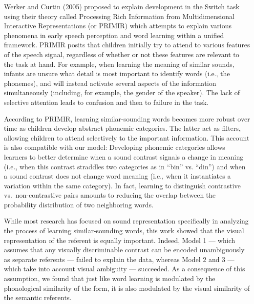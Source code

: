 \documentclass[english,,man]{apa6}
\theoremstyle{definition}
\theoremstyle{definition}
\theoremstyle{definition}
\theoremstyle{remark}
\begin{document}
Werker and Curtin (2005) proposed to explain development in the Switch
task using their theory called Processing Rich Information from
Multidimensional Interactive Representations (or PRIMIR) which attempts
to explain various phenomena in early speech perception and word
learning within a unified framework. PRIMIR posits that children
initially try to attend to various features of the speech signal,
regardless of whether or not these features are relevant to the task at
hand. For example, when learning the meaning of similar sounds, infants
are unsure what detail is most important to identify words (i.e., the
phonemes), and will instead activate several aspects of the information
simultaneously (including, for example, the gender of the speaker). The
lack of selective attention leads to confusion and then to failure in
the task.

According to PRIMIR, learning similar-sounding words becomes more robust
over time as children develop abstract phonemic categories. The latter
act as filters, allowing children to attend selectively to the important
information. This account is also compatible with our model: Developing
phonemic categories allows learners to better determine when a sound
contrast signals a change in meaning (i.e., when this contrast straddles
two categories as in \enquote{bin} vs. \enquote{din}) and when a sound
contrast does not change word meaning (i.e., when it instantiates a
variation within the same category). In fact, learning to distinguish
contrastive vs.~non-contrastive pairs amounts to reducing the overlap
between the probability distribution of two neighboring words.

While most research has focused on sound representation specifically in
analyzing the process of learning similar-sounding words, this work
showed that the visual representation of the referent is equally
important. Indeed, Model 1 --- which assumes that any visually
discriminable contrast can be encoded unambiguously as separate
referents --- failed to explain the data, whereas Model 2 and 3 ---
which take into account visual ambiguity --- succeeded. As a consequence
of this assumption, we found that just like word learning is modulated
by the phonological similarity of the form, it is also modulated by the
visual similarity of the semantic referents.
\end{document}
